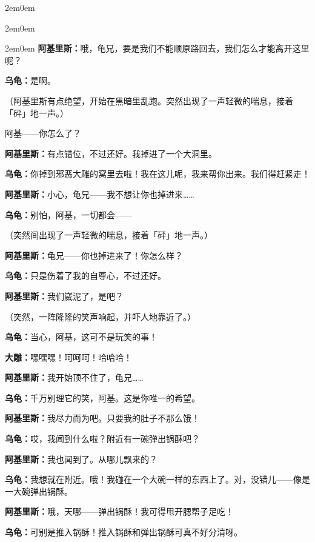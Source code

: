\documentclass[
  12pt,
  twoside,
  openright,
  oldfontcommands,
]{memoir}
\newcommand{\dialogname}[1]{{\heifamily\bfseries #1}}
\begin{document}
\begin{adjustwidth}{2em}{0em}
\begin{adjustwidth}{2em}{0em}
\begin{adjustwidth}{2em}{0em}
\dialogname{阿基里斯：}哦，龟兄，要是我们不能顺原路回去，我们怎么才能离开这里呢？

\dialogname{乌龟：}是啊。

（阿基里斯有点绝望，开始在黑暗里乱跑。突然出现了一声轻微的喘息，接着「砰」地一声。）

阿基------你怎么了？

\dialogname{阿基里斯：}有点错位，不过还好。我掉进了一个大洞里。

\dialogname{乌龟：}你掉到邪恶大雕的窝里去啦！我在这儿呢，我来帮你出来。我们得赶紧走！

\dialogname{阿基里斯：}小心，龟兄------我不想让你也掉进来\ldots\ldots{}

\dialogname{乌龟：}别怕，阿基，一切都会------

（突然间出现了一声轻微的喘息，接着「砰」地一声。）

\dialogname{阿基里斯：}龟兄------你也掉进来了！你怎么样？

\dialogname{乌龟：}只是伤着了我的自尊心，不过还好。

\dialogname{阿基里斯：}我们崴泥了，是吧？

（突然，一阵隆隆的笑声响起，并吓人地靠近了。）

\dialogname{乌龟：}当心，阿基，这可不是玩笑的事！

\dialogname{大雕：}嘿嘿嘿！呵呵呵！哈哈哈！

\dialogname{阿基里斯：}我开始顶不住了，龟兄\ldots\ldots{}

\dialogname{乌龟：}千万别理它的笑，阿基。这是你唯一的希望。

\dialogname{阿基里斯：}我尽力而为吧。只要我的肚子不那么饿！

\dialogname{乌龟：}哎，我闻到什么啦？附近有一碗弹出锅酥吧？

\dialogname{阿基里斯：}我也闻到了。从哪儿飘来的？

\dialogname{乌龟：}我想就在附近。哦！我碰在一个大碗一样的东西上了。对，没错儿------像是一大碗弹出锅酥。

\dialogname{阿基里斯：}哦，天哪------弹出锅酥！我可得甩开腮帮子足吃！

\end{adjustwidth}

\end{adjustwidth}

\end{adjustwidth}

\dialogname{乌龟：}可别是推入锅酥！推入锅酥和弹出锅酥可真不好分清呀。
\end{document}
